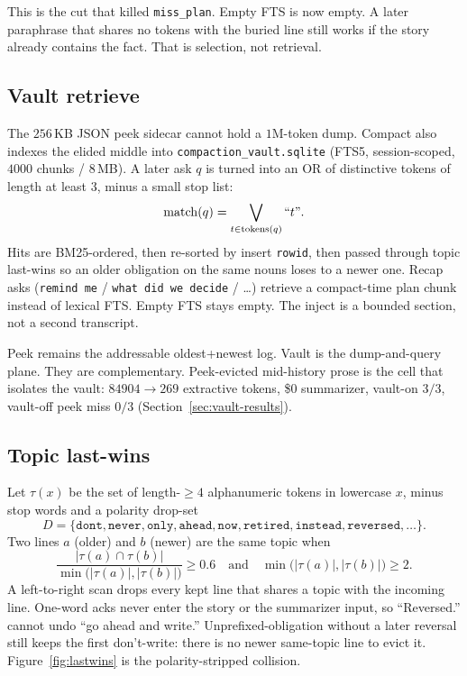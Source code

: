 \documentclass[11pt]{article}
\begin{document}
This is the cut that killed \texttt{miss\_plan}. Empty FTS is now empty.
A later paraphrase that shares no tokens with the buried line still
works if the story already contains the fact. That is selection, not
retrieval.

\subsection{Vault retrieve}
\label{sec:vault}

The $256$\,KB JSON peek sidecar cannot hold a $1$M-token dump. Compact
also indexes the elided middle into \texttt{compaction\_vault.sqlite}
(FTS5, session-scoped, $4000$ chunks / $8$\,MB). A later ask $q$ is
turned into an OR of distinctive tokens of length at least $3$, minus a
small stop list:
\[
\mathrm{match}(q) = \bigvee_{t \in \mathrm{tokens}(q)} ``t".
\]
Hits are BM25-ordered, then re-sorted by insert \texttt{rowid}, then
passed through topic last-wins so an older obligation on the same nouns
loses to a newer one. Recap asks
(\texttt{remind me} / \texttt{what did we decide} / \ldots) retrieve a
compact-time plan chunk instead of lexical FTS. Empty FTS stays empty.
The inject is a bounded section, not a second transcript.

Peek remains the addressable oldest+newest log. Vault is the
dump-and-query plane. They are complementary. Peek-evicted mid-history
prose is the cell that isolates the vault: $84904 \to 269$ extractive
tokens, \$0 summarizer, vault-on $3/3$, vault-off peek miss $0/3$
(Section~\ref{sec:vault-results}).

\subsection{Topic last-wins}
\label{sec:lastwins}

Let $\tau(x)$ be the set of length-${\ge}4$ alphanumeric tokens in
lowercase $x$, minus stop words and a polarity drop-set
\[
D = \{\texttt{dont},\texttt{never},\texttt{only},\texttt{ahead},
\texttt{now},\texttt{retired},\texttt{instead},\texttt{reversed},\ldots\}.
\]
Two lines $a$ (older) and $b$ (newer) are the same topic when
\[
\frac{|\tau(a)\cap\tau(b)|}{\min\bigl(|\tau(a)|,|\tau(b)|\bigr)} \ge 0.6
\quad\text{and}\quad \min\bigl(|\tau(a)|,|\tau(b)|\bigr) \ge 2.
\]
A left-to-right scan drops every kept line that shares a topic with the
incoming line. One-word acks never enter the story or the summarizer
input, so ``Reversed.'' cannot undo ``go ahead and write.''
Unprefixed-obligation without a later reversal still keeps the first
don't-write: there is no newer same-topic line to evict it.
Figure~\ref{fig:lastwins} is the polarity-stripped collision.
\end{document}
